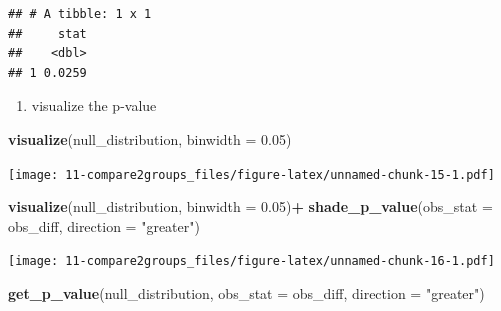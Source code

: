 \documentclass[
]{book}
\newenvironment{Shaded}{\begin{snugshade}}{\end{snugshade}}
\newcommand{\DataTypeTok}[1]{\textcolor[rgb]{0.13,0.29,0.53}{#1}}
\newcommand{\FloatTok}[1]{\textcolor[rgb]{0.00,0.00,0.81}{#1}}
\newcommand{\KeywordTok}[1]{\textcolor[rgb]{0.13,0.29,0.53}{\textbf{#1}}}
\newcommand{\NormalTok}[1]{#1}
\newcommand{\OperatorTok}[1]{\textcolor[rgb]{0.81,0.36,0.00}{\textbf{#1}}}
\newcommand{\StringTok}[1]{\textcolor[rgb]{0.31,0.60,0.02}{#1}}
\providecommand{\tightlist}{%
  \setlength{\itemsep}{0pt}\setlength{\parskip}{0pt}}
\begin{document}
\begin{Shaded}
\end{Shaded}

\begin{verbatim}
## # A tibble: 1 x 1
##     stat
##    <dbl>
## 1 0.0259
\end{verbatim}

\begin{enumerate}
\def\labelenumi{\arabic{enumi}.}
\setcounter{enumi}{2}
\tightlist
\item
  visualize the p-value
\end{enumerate}

\begin{Shaded}
\begin{Highlighting}[]
\KeywordTok{visualize}\NormalTok{(null_distribution, }\DataTypeTok{binwidth =} \FloatTok{0.05}\NormalTok{)}
\end{Highlighting}
\end{Shaded}

\texttt{[image: 11-compare2groups\_files/figure-latex/unnamed-chunk-15-1.pdf]}

\begin{Shaded}
\begin{Highlighting}[]
\KeywordTok{visualize}\NormalTok{(null_distribution, }\DataTypeTok{binwidth =} \FloatTok{0.05}\NormalTok{)}\OperatorTok{+}\StringTok{ }
\StringTok{  }\KeywordTok{shade_p_value}\NormalTok{(}\DataTypeTok{obs_stat =}\NormalTok{ obs_diff, }\DataTypeTok{direction =} \StringTok{"greater"}\NormalTok{)}
\end{Highlighting}
\end{Shaded}

\texttt{[image: 11-compare2groups\_files/figure-latex/unnamed-chunk-16-1.pdf]}

\begin{Shaded}
\begin{Highlighting}[]
\KeywordTok{get_p_value}\NormalTok{(null_distribution, }\DataTypeTok{obs_stat =}\NormalTok{ obs_diff, }\DataTypeTok{direction =} \StringTok{"greater"}\NormalTok{)}
\end{Highlighting}
\end{Shaded}
\end{document}
